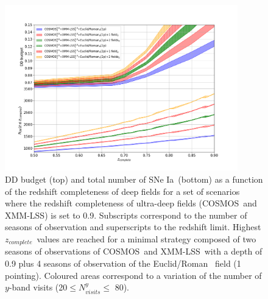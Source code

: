 \documentclass[skiphelvet,twocolumn]{lsstdescnote}
\newcommand{\cosmos}{{COSMOS}}
\newcommand{\xmm}{{XMM-LSS}}
\newcommand{\adfs}{{Euclid/Roman}}
\newcommand{\sne}{{SNe Ia}}
\newcommand{\zcomp}{\mbox{$z_{complete}$}}
\begin{document}
\begin{figure}[htbp]
\begin{center}
  \includegraphics[width=0.9\textwidth]{budget_zcomp.png}
  \caption{DD budget (top) and total number of \sne~(bottom) as a function of the redshift completeness of deep fields for a set of scenarios where the redshift completeness of ultra-deep fields (\cosmos~and \xmm) is set to 0.9. Subscripts correspond to the number of seasons of observation and superscripts to the redshift limit. Highest \zcomp~values are reached for a minimal strategy composed of two seasons of observations of \cosmos~and \xmm~with a depth of 0.9 plus 4 seasons of observation of the \adfs~ field (1 pointing). Coloured areas correspond to a variation of the number of $y$-band visits (20$\leq N_{visits}^y \leq$ 80).}\label{fig:budget_zcomp}
\end{center}
\end{figure}
\end{document}

